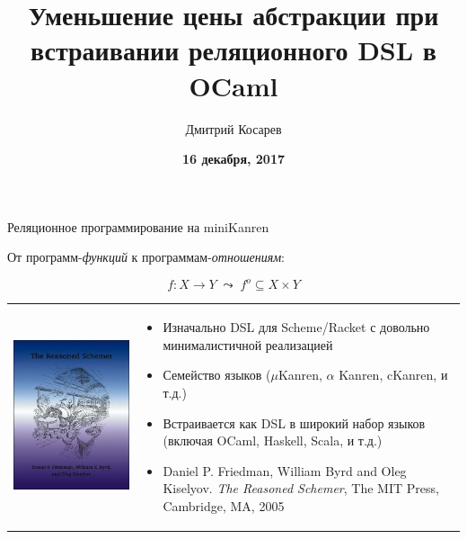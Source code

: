 \documentclass[10pt, mathserif]{beamer}
\title{Уменьшение цены абстракции при встраивании реляционного DSL в OCaml}
\author{Дмитрий Косарев}
\institute[]{
\small{
\textbf{Лаборатория языковых инструментов}
}
}
\date{
  \vskip 2cm
  \small{
  \textbf{16 декабря, 2017}
  }
}
\newcommand{\oo}[1]{{#1}^o}
\theoremstyle{definition}
\begin{document}
\begin{frame}
  \titlepage
\end{frame}

\begin{frame}{Реляционное программирование на miniKanren}
 \begin{center}
 От программ-\emph{функций} к программам-\emph{отношениям}:
 \end{center}

 $$
 f \colon X \to Y\;\leadsto\;\oo{f} \subseteq X\times Y
 $$
 \vskip5mm
 \begin{tabular}{m{4cm}m{6cm}}
    \includegraphics[scale=0.3]{trs.jpg} &
    \begin{itemize}
       \item Изначально DSL для Scheme/Racket с довольно минималистичной реализацией
       \item Семейство языков ($\mu$Kanren, $\alpha$  Kanren, cKanren, и т.д.)
       \item Встраивается как DSL в широкий набор языков (включая OCaml, Haskell, Scala, и т.д.)
       \item Daniel P. Friedman, William Byrd and   Oleg Kiselyov. \emph{The Reasoned Schemer},
       The MIT Press, Cambridge, MA, 2005
    \end{itemize}
 \end{tabular}
 \vskip 3cm
\end{frame}
\end{document}
